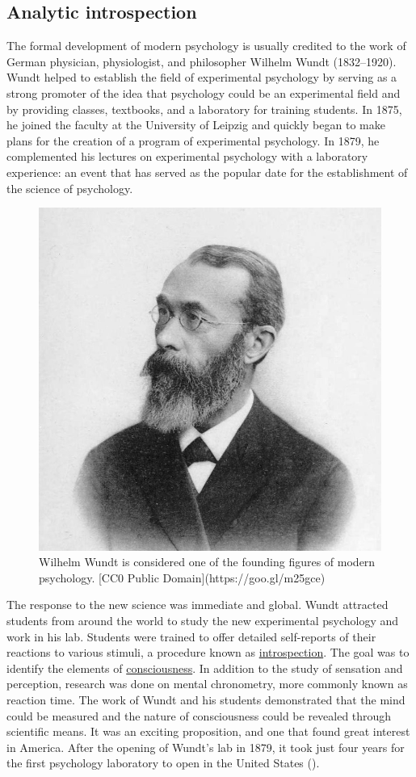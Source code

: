 \documentclass[
]{krantz}
\begin{document}
\subsection*{Analytic introspection}\label{analytic-introspection}


The formal development of modern psychology is usually credited to the work of German physician, physiologist, and philosopher Wilhelm Wundt (1832--1920). Wundt helped to establish the field of experimental psychology by serving as a strong promoter of the idea that psychology could be an experimental field and by providing classes, textbooks, and a laboratory for training students. In 1875, he joined the faculty at the University of Leipzig and quickly began to make plans for the creation of a program of experimental psychology. In 1879, he complemented his lectures on experimental psychology with a laboratory experience: an event that has served as the popular date for the establishment of the science of psychology.

\begin{figure}

{\centering \includegraphics[width=0.4\linewidth]{images/ch1/wundt} 

}

\caption{Wilhelm Wundt is considered one of the founding figures of modern psychology. [CC0 Public Domain](https://goo.gl/m25gce)}\label{fig:wundt}
\end{figure}

The response to the new science was immediate and global. Wundt attracted students from around the world to study the new experimental psychology and work in his lab. Students were trained to offer detailed self-reports of their reactions to various stimuli, a procedure known as \hyperref[introspection]{introspection}. The goal was to identify the elements of \hyperref[consciousness]{consciousness}. In addition to the study of sensation and perception, research was done on mental chronometry, more commonly known as reaction time. The work of Wundt and his students demonstrated that the mind could be measured and the nature of consciousness could be revealed through scientific means. It was an exciting proposition, and one that found great interest in America. After the opening of Wundt's lab in 1879, it took just four years for the first psychology laboratory to open in the United States ().
\end{document}

